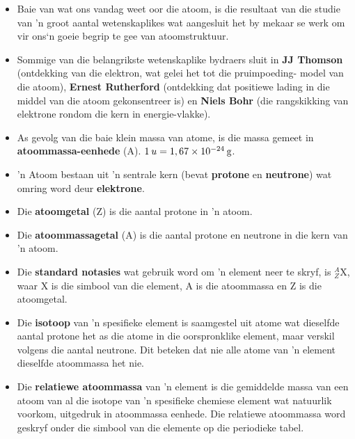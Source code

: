       \label{m38741*id262657}\begin{itemize}[noitemsep]
            \label{m38741*uid169}\item Baie van wat ons vandag weet oor die atoom, is die resultaat van die studie van 'n groot aantal wetenskaplikes wat aangesluit het by mekaar se werk om vir ons‘n goeie begrip te gee van atoomstruktuur.
\label{m38741*uid170}\item Sommige van die belangrikste wetenskaplike bydraers sluit in \textbf{JJ Thomson} (ontdekking van die elektron, wat gelei het tot die pruimpoeding- model van die atoom), \textbf{Ernest Rutherford} (ontdekking dat positiewe lading in die middel van die atoom gekonsentreer is) en \textbf{Niels Bohr} (die rangskikking van elektrone rondom die kern in energie-vlakke).
\label{m38741*uid171}\item As gevolg van die baie klein massa van atome, is die massa gemeet in \textbf{atoommassa-eenhede} (A). $1\phantom{\rule{2pt}{0ex}}u=1,67\ensuremath{\times}10{}^{-24}\phantom{\rule{2pt}{0ex}}\text{g}$.
\label{m38741*uid172}\item 'n Atoom bestaan uit 'n sentrale kern (bevat \textbf{protone} en \textbf{neutrone}) wat omring word deur \textbf{elektrone}.
\label{m38741*uid173}\item Die \textbf{atoomgetal} (Z) is die aantal protone in 'n atoom.
\label{m38741*uid174}\item Die \textbf{atoommassagetal} (A) is die aantal protone en neutrone in die kern van 'n atoom.
\label{m38741*uid175}\item Die \textbf{standard notasies} wat gebruik word om 'n element neer te skryf, is $_{Z}^{A}\text{X}$, waar X is die simbool van die element, A is die atoommassa en Z is die atoomgetal.
\label{m38741*uid176}\item Die \textbf{isotoop} van 'n spesifieke element is saamgestel uit atome wat dieselfde aantal protone het as die atome in die oorspronklike element, maar verskil volgens die aantal neutrone. Dit beteken dat nie alle atome van 'n element dieselfde atoommassa het nie.
\label{m38741*uid177}\item Die \textbf{relatiewe atoommassa} van 'n element is die gemiddelde massa van een atoom van al die isotope van 'n spesifieke chemiese element wat natuurlik voorkom, uitgedruk in atoommassa eenhede. Die relatiewe atoommassa word geskryf onder die simbool van die elemente op die periodieke tabel.

\end{itemize}
